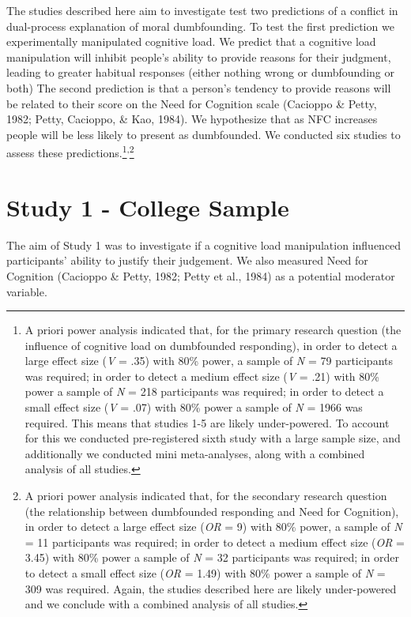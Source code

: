 \documentclass[
  american,
  man,floatsintext]{apa7}
\begin{document}
The studies described here aim to investigate test two predictions of a conflict in dual-process explanation of moral dumbfounding. To test the first prediction we experimentally manipulated cognitive load. We predict that a cognitive load manipulation will inhibit people's ability to provide reasons for their judgment, leading to greater habitual responses (either nothing wrong or dumbfounding or both) The second prediction is that a person's tendency to provide reasons will be related to their score on the Need for Cognition scale (Cacioppo \& Petty, 1982; Petty, Cacioppo, \& Kao, 1984). We hypothesize that as NFC increases people will be less likely to present as dumbfounded. We conducted six studies to assess these predictions.\footnote{A priori power analysis indicated that, for the primary research question (the influence of cognitive load on dumbfounded responding), in order to detect a large effect size (\emph{V} = .35) with 80\% power, a sample of \emph{N} = 79 participants was required; in order to detect a medium effect size (\emph{V} = .21) with 80\% power a sample of \emph{N} = 218 participants was required; in order to detect a small effect size (\emph{V} = .07) with 80\% power a sample of \emph{N} = 1966 was required. This means that studies 1-5 are likely under-powered. To account for this we conducted pre-registered sixth study with a large sample size, and additionally we conducted mini meta-analyses, along with a combined analysis of all studies.}\textsuperscript{,}\footnote{A priori power analysis indicated that, for the secondary research question (the relationship between dumbfounded responding and Need for Cognition), in order to detect a large effect size (\emph{OR} = 9) with 80\% power, a sample of \emph{N} = 11 participants was required; in order to detect a medium effect size (\emph{OR} = 3.45) with 80\% power a sample of \emph{N} = 32 participants was required; in order to detect a small effect size (\emph{OR} = 1.49) with 80\% power a sample of \emph{N} = 309 was required. Again, the studies described here are likely under-powered and we conclude with a combined analysis of all studies.}

\hypertarget{study-1---college-sample}{%
\section{Study 1 - College Sample}\label{study-1---college-sample}}

The aim of Study 1 was to investigate if a cognitive load manipulation influenced participants' ability to justify their judgement. We also measured Need for Cognition (Cacioppo \& Petty, 1982; Petty et al., 1984) as a potential moderator variable.
\end{document}
